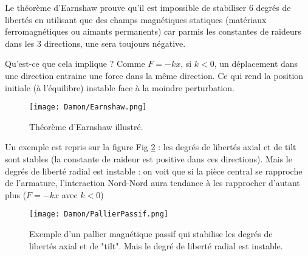 Le théorème d'Earnshaw prouve qu'il est impossible de stabiliser 6 degrés de libertés en utilisant que des champs magnétiques statiques (matériaux ferromagnétiques ou aimants permanents) car parmis les constantes de raideurs dans les 3 directions, une sera toujours négative. 

Qu'est-ce que cela implique ?
Comme $F = -kx$, si $k < 0$, un déplacement dans une direction entraine une force dans la même direction. Ce qui rend la position initiale (à l'équilibre) instable face à la moindre perturbation.

\begin{figure}[htb!]
    \centering
    \texttt{[image: Damon/Earnshaw.png]}
    \caption{Théorème d'Earnshaw illustré. }
    \label{fig:Earnshaw}
\end{figure}

Un exemple est repris sur la figure Fig \ref{fig:Passif} : les degrés de libertés axial et de tilt sont stables (la constante de raideur est positive dans ces directions). Mais le degrés de liberté radial est instable : on voit que si la pièce central se rapproche de l'armature, l'interaction Nord-Nord aura tendance à les rapprocher d'autant plus ($F = -kx$ avec $k<0$)

\begin{figure}[htb!]
    \centering
    \texttt{[image: Damon/PallierPassif.png]}
    \caption{Exemple d'un pallier magnétique passif qui stabilise les degrés de libertés axial et de "tilt". Mais le degré de liberté radial est instable.}
    \label{fig:Passif}
\end{figure}
\unappendix
